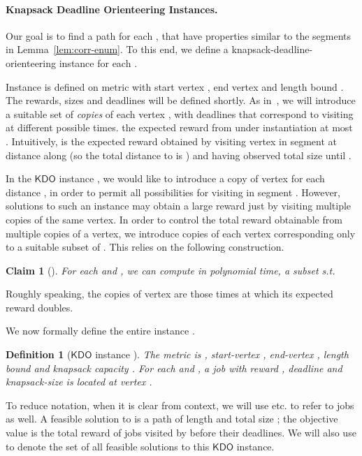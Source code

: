 \documentclass[11pt,letterpaper]{article}
\newtheorem{definition}[theorem]{Definition}
\newtheorem{claim}[theorem]{Claim}
\numberwithin{algorithm}{section}
\newcommand{\kdo}{\ensuremath{\mathsf{KDO}}\xspace}
\begin{document}
\paragraph{Knapsack Deadline Orienteering Instances.} Our goal is to find a  path  for each , that have properties similar to the segments in Lemma~\ref{lem:corr-enum}. To this end, we define a knapsack-deadline-orienteering instance  for each .


Instance  is defined on metric  with start vertex , end vertex  and length bound . The rewards, sizes and deadlines will be defined shortly. As in~\cite{GKNR12}, we will introduce a suitable set of {\em copies} of each vertex , with deadlines that correspond to visiting  at different possible times.
 the expected reward from  under instantiation at most . Intuitively,  is the expected reward obtained by visiting vertex  in segment  at distance  along  (so the total distance to  is ) and having observed total size  until .

In the \kdo instance , we would like to introduce a copy of vertex  for each distance , in order to permit all possibilities for visiting  in segment .
However, solutions to such an instance may obtain a large reward just by visiting multiple copies of the same vertex. In order to control the total reward obtainable from multiple copies of a vertex, we introduce copies of each vertex corresponding only to a suitable subset of . This relies on the following construction.
\begin{claim}[\cite{GKNR12}] \label{cl:gknr-count}
For each  and , we can compute in polynomial time, a subset  s.t.

\end{claim}
Roughly speaking, the copies  of vertex  are those times  at which its expected reward  doubles.

We now formally define the entire instance .
\begin{definition}[\kdo instance ]
The metric is , start-vertex , end-vertex , length bound  and knapsack capacity . For each  and , a job  with reward , deadline  and knapsack-size  is located at vertex .
\end{definition}

To reduce notation, when it is clear from context, we will use  etc. to refer to jobs as well. A feasible solution  to  is a  path of length  and total size ; the objective value is the total reward of jobs visited by  before their deadlines. We will also use  to denote the set of all feasible solutions to this \kdo instance.
\end{document}

